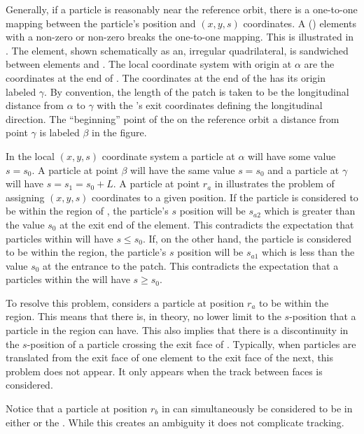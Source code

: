 Generally, if a particle is reasonably near the reference orbit, there is a one-to-one mapping
between the particle's position and $(x, y, s)$ coordinates. A  () elements
with a non-zero  or non-zero  breaks the one-to-one mapping. This is
illustrated in .  The  element, shown schematically as an, irregular
quadrilateral, is sandwiched between elements  and . The local coordinate system
with origin at $\alpha$ are the coordinates at the end of . The coordinates at the end of
the  has its origin labeled $\gamma$. By convention, the length of the patch  is
taken to be the longitudinal distance from $\alpha$ to $\gamma$ with the 's exit
coordinates defining the longitudinal direction. The ``beginning'' point of the  on the
reference orbit a distance  from point $\gamma$ is labeled $\beta$ in the figure.

In the local $(x, y, s)$ coordinate system a particle at $\alpha$ will have some value $s = s_0$. A
particle at point $\beta$ will have the same value $s = s_0$ and a particle at $\gamma$ will have $s
= s_1 = s_0 + L$. A particle at point $r_a$ in  illustrates the problem of
assigning $(x, y, s)$ coordinates to a given position. If the particle is considered to be within
the region of , the particle's $s$ position will be $s_{a2}$ which is greater than the
value $s_0$ at the exit end of the element. This contradicts the expectation that particles within
 will have $s \le s_0$.  If, on the other hand, the particle is considered to be within
the  region, the particle's $s$ position will be $s_{a1}$ which is less than the value
$s_0$ at the entrance to the patch. This contradicts the expectation that a particles within the
 will have $s \ge s_0$.

To resolve this problem, \bmad considers a particle at position $r_a$ to be within the 
region. This means that there is, in theory, no lower limit to the $s$-position that a particle in
the  region can have. This also implies that there is a discontinuity in the $s$-position
of a particle crossing the exit face of . Typically, when particles are translated from the
exit face of one element to the exit face of the next, this  problem does not appear. It
only appears when the track between faces is considered.

Notice that a particle at position $r_b$ in  can simultaneously be considered to
be in either  or the . While this creates an ambiguity it does not complicate
tracking.

